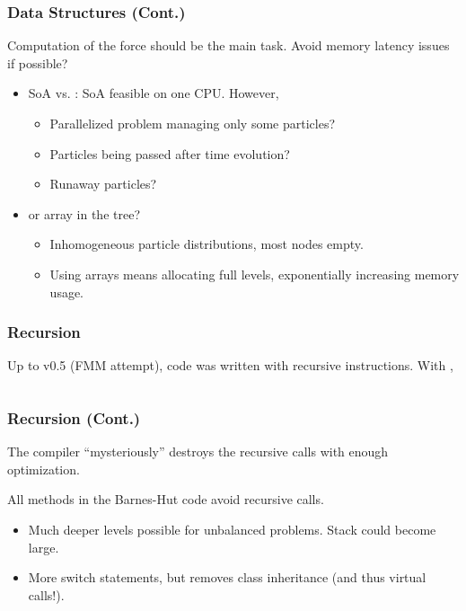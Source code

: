 \begin{frame}
	\frametitle{Data Structures (Cont.)}
	Computation of the force should be the main task. Avoid memory latency issues if possible?
	\begin{itemize}
		\item<1-> SoA vs. : SoA feasible on one CPU. However,
		\begin{itemize}
			\item Parallelized problem managing only some particles?
			\item Particles being passed after time evolution?
			\item Runaway particles?
		\end{itemize}
		\item<2->  or array in the tree?
		\begin{itemize}
			\item Inhomogeneous particle distributions, most nodes empty.
			\item Using arrays means allocating full levels, exponentially increasing memory usage.
		\end{itemize}
	\end{itemize}

\end{frame}

\begin{frame}[t]
\frametitle{Recursion}
Up to v0.5 (FMM attempt), code was written with recursive instructions. With ,
\begin{columns}
	\begin{column}{0.7\textwidth}
		\only<1>{}
		\only<2>{}
	\end{column}
	\begin{column}{0.3\textwidth}
		\only<2>{\SI{6.45}{\second} per iter.}
		
	\end{column}
\end{columns}
\end{frame}

\begin{frame}
	\frametitle{Recursion (Cont.)}
	The compiler ``mysteriously'' destroys the recursive calls with enough optimization.
	
	All methods in the Barnes-Hut code avoid recursive calls.
	\begin{itemize}
		\item Much deeper levels possible for unbalanced problems. Stack could become large.
		\item More switch statements, but removes class inheritance (and thus virtual calls!).
	\end{itemize}
\end{frame}
